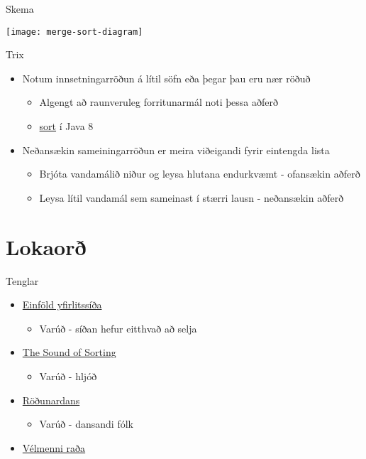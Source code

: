 \documentclass[handout]{beamer}
\begin{document}
\begin{frame}{Skema}
\begin{center}
\texttt{[image: merge-sort-diagram]}
\end{center}
\end{frame}


\begin{frame}{Trix}
\begin{itemize}
 \item Notum innsetningarröðun á lítil söfn eða þegar þau eru nær röðuð
 \begin{itemize}
  \item Algengt að raunveruleg forritunarmál noti þessa aðferð
  \item \href{https://docs.oracle.com/javase/8/docs/api/java/util/Arrays.html}{sort} í Java 8
 \end{itemize}
 \item Neðansækin  sameiningarröðun er meira viðeigandi fyrir eintengda lista
 \begin{itemize}
  \item Brjóta vandamálið niður og leysa hlutana endurkvæmt - ofansækin aðferð
  \item Leysa lítil vandamál sem sameinast í stærri lausn - neðansækin aðferð
 \end{itemize}
\end{itemize}
\end{frame}

\section{Lokaorð}

\begin{frame}{Tenglar}
\begin{itemize}
 \item \href{https://www.toptal.com/developers/sorting-algorithms/}{Einföld yfirlitssíða}
 \begin{itemize}
  \item Varúð - síðan hefur eitthvað að selja
 \end{itemize}
 \item \href{https://www.youtube.com/watch?v=kPRA0W1kECg}{The Sound of Sorting}
 \begin{itemize}
  \item Varúð - hljóð
 \end{itemize}
 \item \href{https://www.youtube.com/watch?v=ROalU379l3U}{Röðunardans}
 \begin{itemize}
  \item Varúð - dansandi fólk
 \end{itemize}
 \item \href{https://www.youtube.com/watch?v=es2T6KY45cA}{Vélmenni raða}
\end{itemize}
\end{frame}
\end{document}
